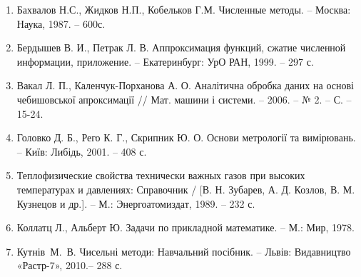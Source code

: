 \documentclass[ukrainian,14pt]{extarticle}
\begin{document}
\begin{enumerate}



\item Бахвалов Н.С., Жидков Н.П., Кобельков Г.М. Численные методы. –
Москва: Наука, 1987. – 600с.

\item Бердышев В. И., Петрак Л. В. Аппроксимация функций, сжатие
численной информации, приложение. – Екатеринбург: УрО РАН, 1999. –
297 с.

\item Вакал Л. П., Каленчук-Порханова А. О. Аналітична обробка даних на
основі чебишовської апроксимації // Мат. машини і системи. – 2006. – № 2. – С. –
15-24.

\item Головко Д. Б., Рего К. Г., Скрипник Ю. О. Основи метрології та
вимірювань. – Київ: Либідь, 2001. – 408 с.

\item Теплофизические свойства технически важных газов при высоких
температурах и давлениях: Справочник / [В. Н. Зубарев, А. Д. Козлов, В.
М. Кузнецов и др.]. – М.: Энергоатомиздат, 1989. – 232 с.

\item Коллатц Л., Альберт Ю. Задачи по прикладной математике. – М.: Мир, 1978.

\item Кутнів М. В. Чисельні методи: Навчальний посібник. – Львів:
Видавництво «Растр-7», 2010.– 288 с.


\end{enumerate}
\end{document}
